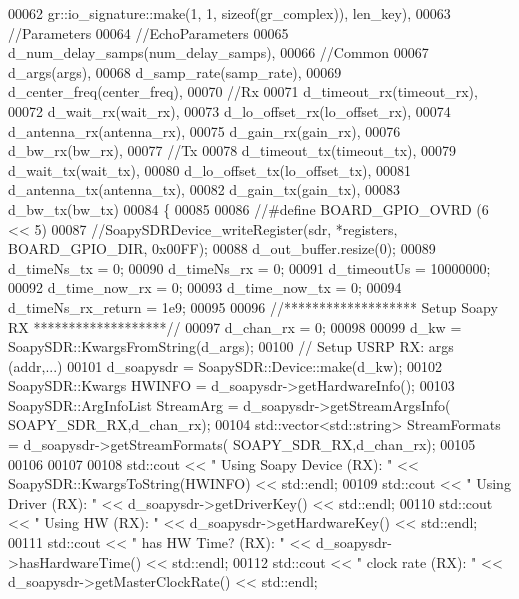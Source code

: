 \begin{DoxyCode}
00062       gr::io\_signature::make(1, 1, sizeof(gr\_complex)), len\_key),
00063       \textcolor{comment}{//Parameters}
00064         \textcolor{comment}{//EchoParameters}
00065         d\_num\_delay\_samps(num\_delay\_samps),
00066         \textcolor{comment}{//Common}
00067         d\_args(args),
00068         d\_samp\_rate(samp\_rate),
00069         d\_center\_freq(center\_freq),
00070         \textcolor{comment}{//Rx}
00071         d\_timeout\_rx(timeout\_rx),
00072         d\_wait\_rx(wait\_rx),
00073         d\_lo\_offset\_rx(lo\_offset\_rx),
00074         d\_antenna\_rx(antenna\_rx),
00075         d\_gain\_rx(gain\_rx),
00076         d\_bw\_rx(bw\_rx),
00077         \textcolor{comment}{//Tx}
00078         d\_timeout\_tx(timeout\_tx),
00079         d\_wait\_tx(wait\_tx),
00080         d\_lo\_offset\_tx(lo\_offset\_tx),
00081         d\_antenna\_tx(antenna\_tx),
00082         d\_gain\_tx(gain\_tx),
00083         d\_bw\_tx(bw\_tx)
00084       \{
00085 
00086       \textcolor{comment}{//#define BOARD\_GPIO\_OVRD (6 << 5)}
00087       \textcolor{comment}{//SoapySDRDevice\_writeRegister(sdr, *registers, BOARD\_GPIO\_DIR, 0x00FF);}
00088       d_out_buffer.resize(0);
00089       d_timeNs_tx = 0;
00090       d_timeNs_rx = 0;
00091       d_timeoutUs = 10000000;
00092       d_time_now_rx = 0;
00093       d_time_now_tx = 0;
00094       d_timeNs_rx_return = 1e9;
00095 
00096       \textcolor{comment}{//******************* Setup Soapy RX *******************//}
00097       d_chan_rx = 0;
00098 
00099       d_kw = SoapySDR::KwargsFromString(d_args);
00100       \textcolor{comment}{// Setup USRP RX: args (addr,...)}
00101       d_soapysdr = SoapySDR::Device::make(d_kw);
00102       SoapySDR::Kwargs  HWINFO = d_soapysdr->getHardwareInfo();
00103       SoapySDR::ArgInfoList StreamArg = d_soapysdr->getStreamArgsInfo(
      SOAPY_SDR_RX,d_chan_rx);
00104       std::vector<std::string> StreamFormats = d_soapysdr->getStreamFormats(
      SOAPY_SDR_RX,d_chan_rx);
00105 
00106 
00107 
00108       std::cout << \textcolor{stringliteral}{" Using Soapy Device (RX): "} << SoapySDR::KwargsToString(HWINFO) << std::endl;
00109       std::cout << \textcolor{stringliteral}{" Using Driver (RX): "} << d_soapysdr->getDriverKey() << std::endl;
00110       std::cout << \textcolor{stringliteral}{" Using HW (RX): "} << d_soapysdr->getHardwareKey() << std::endl;
00111       std::cout << \textcolor{stringliteral}{" has HW Time? (RX): "} << d_soapysdr->hasHardwareTime() << std::endl;
00112       std::cout << \textcolor{stringliteral}{" clock rate (RX): "} << d_soapysdr->getMasterClockRate() << std::endl;

\end{DoxyCode}
